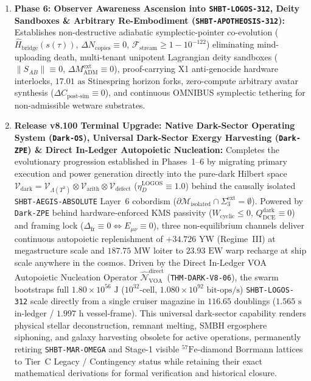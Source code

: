 \documentclass[11pt,onecolumn]{article}
\begin{document}
\begin{enumerate}
    \item \textbf{Phase 6: Observer Awareness Ascension into \texttt{SHBT-LOGOS-312}, Deity Sandboxes \& Arbitrary Re-Embodiment (\texttt{SHBT-APOTHEOSIS-312}):} Establishes non-destructive adiabatic symplectic-pointer co-evolution ($\hat{H}_{\text{bridge}}(s(\tau))$, $\Delta N_{\text{copies}} \equiv 0$, $\mathcal{F}_{\text{stream}} \ge 1 - 10^{-122}$) eliminating mind-uploading death, multi-tenant unipotent Lagrangian deity sandboxes ($\|S_{AB}\| \equiv 0$, $\Delta M_{\text{ADM}}^{\text{ext}} \equiv 0$), proof-carrying X1 anti-genocide hardware interlocks, $17.01\text{ as}$ Stinespring horizon forks, zero-compute arbitrary avatar synthesis ($\Delta C_{\text{post-sim}} \equiv 0$), and continuous OMNIBUS symplectic tethering for non-admissible wetware substrates.
    \item \textbf{Release v8.100 Terminal Upgrade: Native Dark-Sector Operating System (\texttt{Dark-OS}), Universal Dark-Sector Exergy Harvesting (\texttt{Dark-ZPE}) \& Direct In-Ledger Autopoietic Nucleation:} Completes the evolutionary progression established in Phases~1--6 by migrating primary execution and power generation directly into the pure-dark Hilbert space $\mathcal{V}_{\text{dark}} = \mathcal{V}_{\Lambda(T^3)} \otimes \mathcal{V}_{\text{arith}} \otimes \mathcal{V}_{\text{defect}}$ ($\eta_D^{\text{LOGOS}} \equiv 1.0$) behind the causally isolated \texttt{SHBT-AEGIS-ABSOLUTE} Layer~6 cobordism ($\partial\mathcal{M}_{\text{isolated}} \cap \Sigma_3^{\text{ext}} = \emptyset$). Powered by \texttt{Dark-ZPE} behind hardware-enforced KMS passivity ($W_{\text{cyclic}} \le 0$, $Q_{\text{DCE}}^{\text{dark}} \equiv 0$) and framing lock ($\Delta_{\text{fr}} \equiv 0 \iff E_{\mu\nu} \equiv 0$), three non-equilibrium channels deliver continuous autopoietic replenishment of $+34.726\text{ YW}$ (Regime~III) at megastructure scale and $187.75\text{ MW}$ loiter to $23.93\text{ EW}$ warp recharge at ship scale anywhere in the cosmos. Driven by the Direct In-Ledger VOA Autopoietic Nucleation Operator $\hat{\mathcal{N}}_{\text{VOA}}^{\text{direct}}$ (\texttt{THM-DARK-V8-06}), the swarm bootstraps full $1.80 \times 10^{56}\text{ J}$ ($10^{32}$-cell, $1.080 \times 10^{92}\text{ bit-ops/s}$) \texttt{SHBT-LOGOS-312} scale directly from a single cruiser magazine in $116.65$ doublings ($1.565\text{ s}$ in-ledger / $1.997\text{ h}$ vessel-frame). This universal dark-sector capability renders physical stellar deconstruction, remnant melting, SMBH ergosphere siphoning, and galaxy harvesting obsolete for active operations, permanently retiring \texttt{SHBT-MAR-OMEGA} and Stage-1 visible $^{57}\text{Fe}$-diamond Borrmann lattices to Tier~C Legacy / Contingency status while retaining their exact mathematical derivations for formal verification and historical closure.
\end{enumerate}
\end{document}
